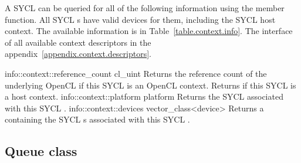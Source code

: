 A SYCL  can be queried for all of the following information using the
 member function. All SYCL s have valid devices for them, including the SYCL host context. The available information is in Table~\ref{table.context.info}. The interface of all available context descriptors in the appendix~\ref{appendix.context.descriptors}.


\addInfoRow
{info::context::reference_count}
{cl_uint}
{
  Returns the reference count of the underlying OpenCL  if this SYCL  is an OpenCL context. Returns  if this SYCL  is a host context.
}
\addInfoRow
{info::context::platform}
{platform}
{
  Returns the SYCL  associated with this SYCL .
}
\addInfoRow
{info::context::devices}
{vector_class<device>}
{
  Returns a  containing the SYCL s associated with this SYCL .
}
\completeInfoTable




\subsection{Queue class}
\label{sec:interface.queue.class}


